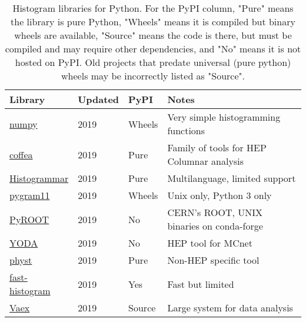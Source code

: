 \documentclass{webofc}
\begin{document}
\begin{table}
	\centering
	\caption{Histogram libraries for Python. For the PyPI column, "Pure" means the library is pure Python, "Wheels" means it is compiled but binary wheels are available, "Source" means the code is there, but must be compiled and may require other dependencies, and "No" means it is not hosted on PyPI. Old projects that predate universal (pure python) wheels may be incorrectly listed as "Source".}
	\label{tab-libraries}       %
	\small
	\begin{tabular}{llll}
		\hline
		Library                                                                      & Updated & PyPI   & Notes                                                \\ \hline
		\href{https://www.numpy.org/}{numpy}                                         & 2019         & Wheels & Very simple histogramming functions                  \\
		\href{https://coffeateam.github.io/coffea/notebooks/histograms.html}{coffea} & 2019         & Pure   & Family of tools for HEP Columnar analysis            \\
		\href{https://histogrammar.org}{Histogrammar}                                & 2019         & Pure   & Multilanguage, limited support                       \\
		\href{https://pygram11.readthedocs.io}{pygram11}                             & 2019         & Wheels & Unix only, Python 3 only                             \\
		\href{https://root.cern.ch/pyroot}{PyROOT}                                   & 2019         & No     & CERN's ROOT, UNIX binaries on conda-forge            \\
		\href{https://yoda.hepforge.org}{YODA}                                       & 2019         & No     & HEP tool for MCnet                                   \\
		\href{https://physt.readthedocs.io/en/latest/tutorial.html}{physt}           & 2019         & Pure   & Non-HEP specific tool                                \\
		\href{https://github.com/astrofrog/fast-histogram}{fast-histogram}           & 2019         & Yes    & Fast but limited                                     \\
		\href{https://vaex.io}{Vaex}                                                 & 2019         & Source & Large system for data analysis                       \\

\end{tabular}
\end{table}
\end{document}

